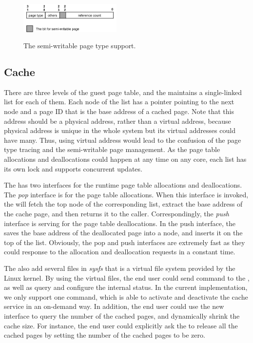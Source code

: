 \begin{figure}[ht]
\centering
\includegraphics[width=0.45\textwidth]{image/implementation/field-of-semi-type.jpg} \\
\caption{The semi-writable page type support.}
\label{fig:field-of-semi-type}
\end{figure}

\subsection{\name Cache}
There are three levels of the guest page table, and the \cache maintains a single-linked list for each of them.
Each node of the list has a pointer pointing to the next node and a page ID that is the base address of a cached page.
Note that this address should be a physical address, rather than a virtual address, because physical address is unique in the whole system but its virtual addresses could have many.
Thus, using virtual address would lead to the confusion of the page type tracing and the semi-writable page management.
As the page table allocations and deallocations could happen at any time on any core, each list has its own lock and supports concurrent updates.

The \cache has two interfaces for the runtime page table allocations and deallocations.
The \emph{pop} interface is for the page table allocations.
When this interface is invoked, the \cache will fetch the top node of the corresponding list, extract the base address of the cache page, and then returns it to the caller.
Correspondingly, the \emph{push} interface is serving for the page table deallocations.
In the push interface, the \cache saves the base address of the deallocated page into a node, and inserts it on the top of the list.
Obviously, the pop and push interfaces are extremely fast as they could response to the allocation and deallocation requests in a constant time.

The \cache also add several files in \emph{sysfs} that is a virtual file system provided by the Linux kernel. 
By using the virtual files, the end user could send command to the \cache, as well as query and configure the internal status.
In the current implementation, we only support one command, which is able to activate and deactivate the cache service in an on-demand way.
In addition, the end user could use the new interface to query the number of the cached pages, and dynamically shrink the cache size. 
For instance, the end user could explicitly ask the \cache to release all the cached pages by setting the number of the cached pages to be zero.

